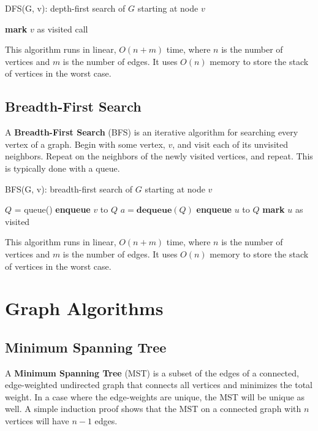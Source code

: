 \documentclass[a4paper]{article}
\theoremstyle{definition}
\begin{document}
\begin{algorithm}[H]
\renewcommand{\thealgorithm}{}
\caption{DFS(G, v): depth-first search of $G$ starting at node $v$}\label{iter-dfs}
\begin{algorithmic}[1]
\State \textbf{mark} $v$ as visited
    \State call 
  \EndIf
\EndFor
\EndProcedure
\end{algorithmic}
\end{algorithm}

This algorithm runs in linear, $O(n+m)$ time, where $n$ is the number of vertices and $m$ is the number of edges. It uses $O(n)$ memory to store the stack of vertices in the worst case. 
\subsection{Breadth-First Search}
A \textbf{Breadth-First Search} (BFS) is an iterative algorithm for searching every vertex of a graph. Begin with some vertex, $v$, and visit each of its unvisited neighbors. Repeat on the neighbors of the newly visited vertices, and repeat. This is typically done with a queue. 

\begin{algorithm}[H]
\renewcommand{\thealgorithm}{}
\caption{BFS(G, v): breadth-first search of $G$ starting at node $v$}\label{iter-dfs}
\begin{algorithmic}[1]
\State $Q$ = queue()
\State \textbf{enqueue} $v$ to $Q$
  \State $a=\textbf{dequeue}(Q)$
      \State \textbf{enqueue} $u$ to $Q$
      \State \textbf{mark} $u$ as visited
    \EndIf
  \EndFor
\EndWhile
\EndProcedure
\end{algorithmic}
\end{algorithm}

This algorithm runs in linear, $O(n+m)$ time, where $n$ is the number of vertices and $m$ is the number of edges. It uses $O(n)$ memory to store the stack of vertices in the worst case. 
\section{Graph Algorithms}
\subsection{Minimum Spanning Tree}
A \textbf{Minimum Spanning Tree} (MST) is a subset of the edges of a connected, edge-weighted undirected graph that connects all vertices and minimizes the total weight. In a case where the edge-weights are unique, the MST will be unique as well. A simple induction proof shows that the MST on a connected graph with $n$ vertices will have $n-1$ edges. 
\end{document}
